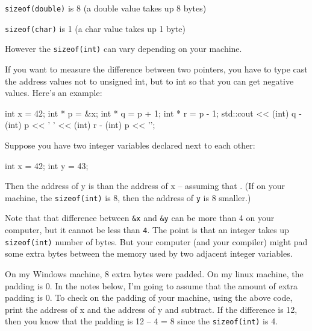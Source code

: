 \texttt{sizeof(double)}      is 8 (a double value takes up 8 bytes)

\texttt{sizeof(char)}        is 1 (a char value takes up 1 byte)

However the \texttt{sizeof(int)} can vary depending on your machine.

If you want to measure the difference between two pointers, you have to type cast the address values not to unsigned int, but to int so that you can get negative values. Here's an example:

\begin{consolethree}[escapeinside=||]
int x = 42;
int * p = &x;
int * q = p + 1;
int * r = p - 1;
std::cout << (int) q - (int) p << ' '
          << (int) r - (int) p << '\n';
\end{consolethree}










\newpage{}

Suppose you have two integer variables declared next to each other:

\begin{consolethree}[escapeinside=||]
int x = 42;
int y = 43;
\end{consolethree}

Then the address of y is  than the address of x -- assuming that \texttt{}. (If on your machine, the \texttt{sizeof(int)} is 8, then the address of \texttt{y} is 8 smaller.)

 Note that that difference between \texttt{\&x} and \texttt{\&y} can be more than 4 on your computer, but it cannot be less than \texttt{4}. The point is that an integer takes up \texttt{sizeof(int)} number of bytes. But your computer (and your compiler) might pad some extra bytes between the memory used by two adjacent integer variables.

On my Windows machine, 8 extra bytes were padded. On my linux machine, the padding is 0. In the notes below, I'm going to assume that the amount of extra padding is 0. To check on the padding of your machine, using the above code, print the address of x and the address of y and subtract. If the difference is 12, then you know that the padding is 12 -- 4 = 8 since the \texttt{sizeof(int)} is 4.

